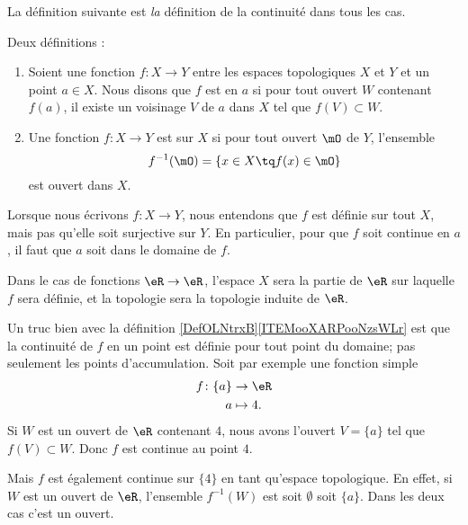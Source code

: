 La définition suivante est \emph{la} définition de la continuité dans tous les cas.
\begin{definition}\label{DefOLNtrxB}
    Deux définitions :
    \begin{enumerate}
        \item   \label{ITEMooXARPooNzsWLr}
            Soient une fonction \( f\colon X\to Y\) entre les espaces topologiques \( X\) et \( Y\) et un point \( a\in X\). Nous disons que \( f\) est  en \( a\) si pour tout ouvert \( W\) contenant \( f(a)\), il existe un voisinage \( V\) de \( a\) dans \( X\) tel que \( f(V)\subset W\).
\item
    Une fonction \( f\colon X\to Y\) est  sur \( X\) si pour tout ouvert \( \mO\) de \( Y\), l'ensemble
    \begin{equation}      \label{defFminus1ofaset}
      f^{-1}(\mO) = \{ x \in X \tq f(x) \in \mO\}
    \end{equation}
est ouvert dans \( X\).
    \end{enumerate}
\end{definition}

\begin{normaltext}
    Lorsque nous écrivons \( f\colon X\to Y\), nous entendons que \( f\) est définie sur tout \( X\), mais pas qu'elle soit surjective sur \( Y\). En particulier, pour que \( f\) soit continue en \( a\), il faut que \( a\) soit dans le domaine de \( f\). 

    Dans le cas de fonctions \( \eR\to \eR\), l'espace \( X\) sera la partie de \( \eR\) sur laquelle \( f\) sera définie, et la topologie sera la topologie induite de \( \eR\).
\end{normaltext} 

\begin{example}
    Un truc bien avec la définition \ref{DefOLNtrxB}\ref{ITEMooXARPooNzsWLr} est que la continuité de \( f\) en un point est définie pour tout point du domaine; pas seulement les points d'accumulation. Soit par exemple une fonction simple
    \begin{equation}
        \begin{aligned}
            f\colon \{a\}&\to \eR \\
            a&\mapsto 4. 
        \end{aligned}
    \end{equation}
    Si \( W\) est un ouvert de \( \eR\) contenant \( 4\), nous avons l'ouvert \( V=\{a\}\) tel que \( f(V)\subset W\). Donc \( f\) est continue au point \( 4\).

    Mais \( f\) est également continue sur \( \{4\}\) en tant qu'espace topologique. En effet, si \( W\) est un ouvert de \( \eR\), l'ensemble \( f^{-1}(W)\) est soit \( \emptyset\) soit \( \{a\}\). Dans les deux cas c'est un ouvert.
\end{example}

